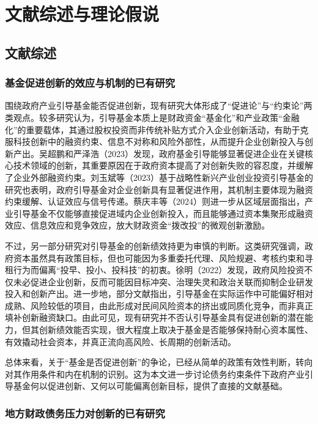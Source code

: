
\section{文献综述与理论假说}

\subsection{文献综述}

\subsubsection{基金促进创新的效应与机制的已有研究}

围绕政府产业引导基金能否促进创新，现有研究大体形成了“促进论”与“约束论”两类观点。较多研究认为，引导基金本质上是财政资金“基金化”和产业政策“金融化”的重要载体，其通过股权投资而非传统补贴方式介入企业创新活动，有助于克服科技创新中的融资约束、信息不对称和风险外部性，从而提升企业创新投入与创新产出。吴超鹏和严泽浩（2023）发现，政府基金引导能够显著促进企业在关键核心技术领域的创新，其重要原因在于政府资本提高了对创新失败的容忍度，并缓解了企业外部融资约束。刘玉斌等（2023）基于战略性新兴产业创业投资引导基金的研究也表明，政府引导基金对企业创新具有显著促进作用，其机制主要体现为融资约束缓解、认证效应与信号传递。蔡庆丰等（2024）则进一步从区域层面指出，产业引导基金不仅能够直接促进域内企业创新投入，而且能够通过资本集聚形成融资效应、信息效应和竞争效应，放大财政资金“拨改投”的微观创新激励。

不过，另一部分研究对引导基金的创新绩效持更为审慎的判断。这类研究强调，政府资本虽然具有政策目标，但也可能因为多重委托代理、风险规避、考核约束和寻租行为而偏离“投早、投小、投科技”的初衷。徐明（2022）发现，政府风险投资不仅未必促进企业创新，反而可能因目标冲突、治理失灵和政治关联而抑制企业研发投入和创新产出。进一步地，部分文献指出，引导基金在实际运作中可能偏好相对成熟、风险较低的项目，由此形成对民间风险资本的挤出或同质化竞争，而非真正填补创新融资缺口。由此可见，现有研究并不否认引导基金具有促进创新的潜在能力，但其创新绩效能否实现，很大程度上取决于基金是否能够保持耐心资本属性、有效撬动社会资本，并真正流向高风险、长周期的创新活动。

总体来看，关于“基金是否促进创新”的争论，已经从简单的政策有效性判断，转向对其作用条件和内在机制的识别。这为本文进一步讨论债务约束条件下政府产业引导基金何以促进创新、又何以可能偏离创新目标，提供了直接的文献基础。

\subsubsection{地方财政债务压力对创新的已有研究}

